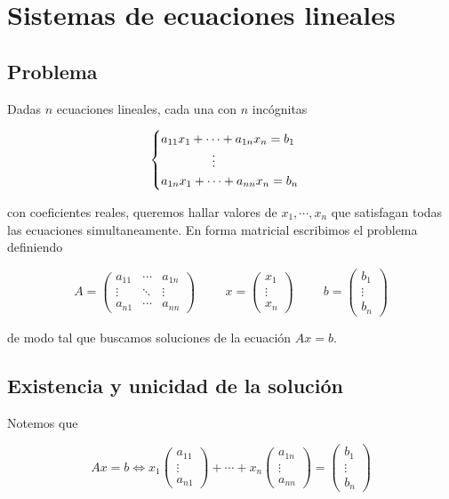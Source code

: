\section{Sistemas de ecuaciones lineales}

\subsection{Problema}

Dadas $n$ ecuaciones lineales, cada una con $n$ incógnitas

\[\begin{cases}
a_{11} x_1 + \cdots + a_{1n} x_n = b_1 \\
\hspace{1.45cm}\vdots \\
a_{1n} x_1 + \cdots + a_{nn} x_n = b_n
\end{cases}\]

con coeficientes reales, queremos hallar valores de $x_1, \cdots, x_n$ que satisfagan todas las ecuaciones simultaneamente. En forma matricial escribimos el problema definiendo

\[A = \begin{pmatrix}
a_{11} & \cdots & a_{1n}\\
\vdots & \ddots & \vdots\\
a_{n1} & \cdots & a_{nn}
\end{pmatrix}
\hspace{1cm}
x = \begin{pmatrix}
x_1 \\
\vdots \\
x_n
\end{pmatrix}
\hspace{1cm}
b = \begin{pmatrix}
b_1 \\
\vdots \\
b_n
\end{pmatrix}\]

de modo tal que buscamos soluciones de la ecuación $Ax = b$.

\subsection{Existencia y unicidad de la solución}

Notemos que

\[
Ax = b \Leftrightarrow x_1 \begin{pmatrix} a_{11}\\ \vdots\\ a_{n1}\end{pmatrix} + \cdots + x_n \begin{pmatrix} a_{1n}\\ \vdots\\ a_{nn}\end{pmatrix} = \begin{pmatrix} b_{1}\\ \vdots\\ b_{n}\end{pmatrix}
\]

